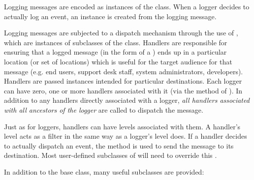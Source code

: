 Logging messages are encoded as instances of the  class.
When a logger decides to actually log an event, an 
instance is created from the logging message.

Logging messages are subjected to a dispatch mechanism through the
use of , which are instances of subclasses of the
 class. Handlers are responsible for ensuring that a logged
message (in the form of a ) ends up in a particular
location (or set of locations) which is useful for the target audience for
that message (e.g. end users, support desk staff, system administrators,
developers). Handlers are passed  instances intended for
particular destinations. Each logger can have zero, one or more handlers
associated with it (via the  method of ).
In addition to any handlers directly associated with a logger,
\emph{all handlers associated with all ancestors of the logger} are
called to dispatch the message.

Just as for loggers, handlers can have levels associated with them.
A handler's level acts as a filter in the same way as a logger's level does.
If a handler decides to actually dispatch an event, the  method
is used to send the message to its destination. Most user-defined subclasses
of  will need to override this .

In addition to the base  class, many useful subclasses
are provided:

